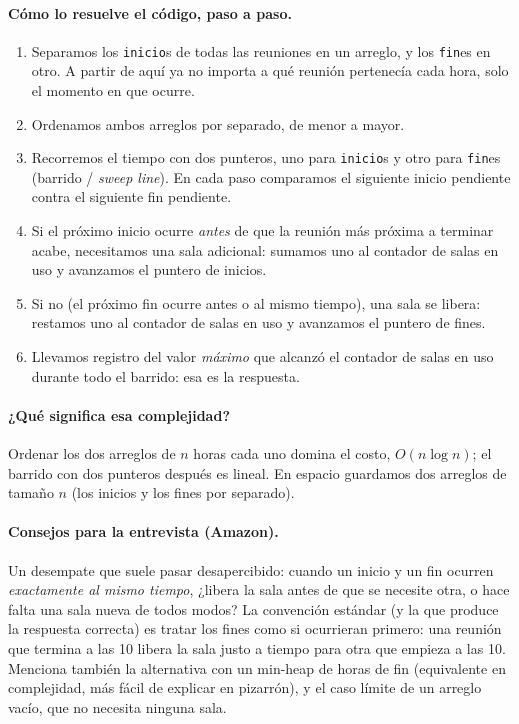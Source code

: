 \paragraph{Cómo lo resuelve el código, paso a paso.}
\begin{enumerate}
  \item Separamos los \texttt{inicio}s de todas las reuniones en un
        arreglo, y los \texttt{fin}es en otro. A partir de aquí ya no
        importa a qué reunión pertenecía cada hora, solo el momento en que
        ocurre.
  \item Ordenamos ambos arreglos por separado, de menor a mayor.
  \item Recorremos el tiempo con dos punteros, uno para \texttt{inicio}s y
        otro para \texttt{fin}es (barrido / \emph{sweep line}). En cada
        paso comparamos el siguiente inicio pendiente contra el siguiente
        fin pendiente.
  \item Si el próximo inicio ocurre \emph{antes} de que la reunión más
        próxima a terminar acabe, necesitamos una sala adicional: sumamos
        uno al contador de salas en uso y avanzamos el puntero de inicios.
  \item Si no (el próximo fin ocurre antes o al mismo tiempo), una sala se
        libera: restamos uno al contador de salas en uso y avanzamos el
        puntero de fines.
  \item Llevamos registro del valor \emph{máximo} que alcanzó el contador de
        salas en uso durante todo el barrido: esa es la respuesta.
\end{enumerate}




\paragraph{¿Qué significa esa complejidad?} Ordenar los dos arreglos de $n$
horas cada uno domina el costo, $O(n \log n)$; el barrido con dos punteros
después es lineal. En espacio guardamos dos arreglos de tamaño $n$ (los
inicios y los fines por separado).

\paragraph{Consejos para la entrevista (Amazon).} Un desempate que suele
pasar desapercibido: cuando un inicio y un fin ocurren \emph{exactamente al
mismo tiempo}, ¿libera la sala antes de que se necesite otra, o hace falta
una sala nueva de todos modos? La convención estándar (y la que produce la
respuesta correcta) es tratar los fines como si ocurrieran primero: una
reunión que termina a las 10 libera la sala justo a tiempo para otra que
empieza a las 10. Menciona también la alternativa con un min-heap de horas
de fin (equivalente en complejidad, más fácil de explicar en pizarrón), y
el caso límite de un arreglo vacío, que no necesita ninguna sala.
